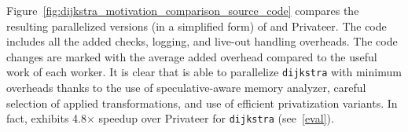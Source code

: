 

Figure~\ref{fig:dijkstra_motivation_comparison_source_code} compares the
resulting parallelized versions (in a simplified form) of \name and
Privateer. The code includes all the added checks, logging, and live-out
handling overheads. The code changes are marked with the average added
overhead compared to the useful work of each worker. It is clear that \name is
able to parallelize \texttt{dijkstra} with minimum overheads thanks to the
use of speculative-aware memory analyzer, careful selection of applied
transformations, and use of efficient privatization variants. In fact,
\name exhibits 4.8$\times$ speedup over Privateer for \texttt{dijkstra}
(see~\ref{eval}).

%
%
%
%
%
%
